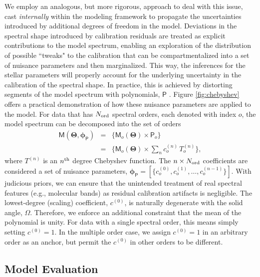 \documentclass[iop,floatfix,numberedappendix,twocolappendix]{emulateapj}
\newcommand{\vM}{\mathsf{M}}
\newcommand{\vT}{ {\bm \Theta}}
\newcommand{\vp}{ {\bm \phi}}
\newcommand{\cheb}{ \vp_{\mathsf{P}}}
\begin{document}
We employ an analogous, but more rigorous, approach to deal with this issue, cast {\it internally}
within the modeling framework to propagate the uncertainties introduced by additional degrees of freedom
in the model.  Deviations in the spectral shape introduced by calibration residuals are treated as
explicit contributions to the model spectrum, enabling an exploration of the distribution of
possible ``tweaks" to the calibration that can be compartmentalized into a set of nuisance
parameters and then marginalized.  This way, the inferences for the stellar parameters will properly
account for the underlying uncertainty in the calibration of the spectral shape.  In practice, this
is achieved by distorting segments of the model spectrum with polynomials, $\mathsf{P}$
\citep[e.g.,][]{eisenstein06,koleva09}. Figure \ref{fig:chebyshev} offers a practical demonstration
of how these nuisance parameters are applied to the model. For data that has $N_{\rm ord}$ spectral
orders, each denoted with index $o$, the model spectrum can be decomposed into the set of orders
\begin{eqnarray} \label{eqn:chebyshev}
\vM(\vT, \cheb) &=& \{ \vM_o(\vT) \times \mathsf{P}_o \} \\
                &=& \{ \vM_o(\vT) \times \sum_n c_o^{(n)} \, T_o^{(n)} \}, \nonumber
\end{eqnarray}
where $T^{(n)}$ is an $n^{\rm th}$ degree Chebyshev function.  The $n \times N_{\rm ord}$ 
coefficients are considered a set of nuisance parameters, $\cheb = [\{c_o^{(0)}, c_o^{(1)}, 
\ldots, c_o^{(n-1)} \}]$.  With judicious priors, we can ensure that the unintended treatment of 
real spectral features (e.g., molecular bands) as residual calibration artifacts is negligible.  
The lowest-degree (scaling) coefficient, $c^{(0)}$, is naturally degenerate with the solid angle, 
$\Omega$.  Therefore, we enforce an additional constraint that the mean of the polynomial is 
unity.  For data with a single spectral order, this means simply setting $c^{(0)} = 1$.  In the 
multiple order case, we assign $c^{(0)} = 1$ in an arbitrary order as an anchor, but permit the 
$c^{(0)}$ in other orders to be different.   

\vspace{1cm}

\subsection{Model Evaluation} \label{subsec:likelihood}
\end{document}
